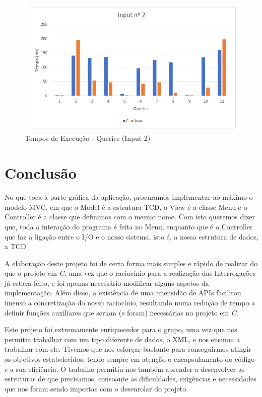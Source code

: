 \documentclass[a4paper, 11pt, oneside]{article}
\begin{document}
\begin{figure}[h] 
\centering
\includegraphics[scale=.5]{input_2.png}
\caption{Tempos de Execução - Queries (Input 2) \label{graphQs2}}
\end{figure}

\newpage
\section{Conclusão}
No que toca à parte gráfica da aplicação, procuramos implementar ao máximo o modelo MVC, em que o Model é a estrutura TCD,
o View é a classe Menu e o Controller é a classe que definimos com o mesmo nome. Com isto queremos dizer que, toda a interação
do programa é feita no Menu, enquanto que é o Controller que faz a ligação entre o I/O e o nosso sistema, isto é, a nossa
estrutura de dados, a TCD.

A elaboração deste projeto foi de certa forma mais simples e rápido de realizar do que o projeto em \textit{C}, uma vez que
o raciocínio para a realização das Interrogações já estava feito, e foi apenas necessário modificar alguns aspetos da
implementação. Além disso, a existência de uma imensidão de APIs facilitou imenso a concretização do nosso raciocínio,
resultando numa redução de tempo a definir funções auxiliares que seriam (e foram) necessárias no projeto em \textit{C}.

Este projeto foi extremamente enriquecedor para o grupo, uma vez que nos permitiu trabalhar com um tipo diferente de dados, o XML, e nos ensinou a trabalhar com ele. 
Tivemos que nos esforçar bastante para conseguirmos atingir os objetivos estabelecidos, tendo sempre em atenção o encapsulamento do código e a sua eficiência. O trabalho 
permitiu-nos também aprender a desenvolver as estruturas de que precisamos, consoante as dificuldades, exigências e necessidades que nos foram sendo impostas com o 
desenrolar do projeto.
\end{document}

